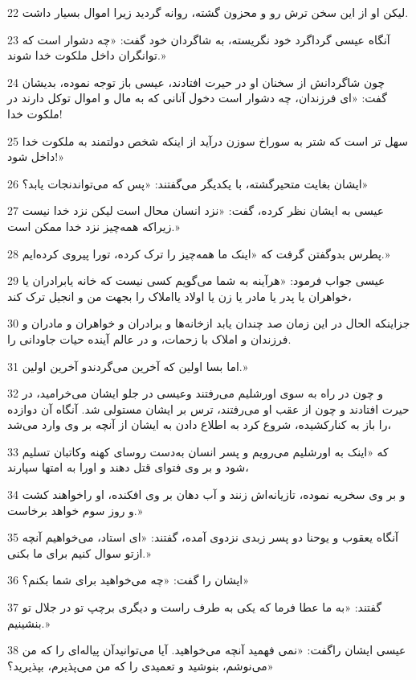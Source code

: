 \par 22 لیکن او از این سخن ترش رو و محزون گشته، روانه گردید زیرا اموال بسیار داشت.
\par 23 آنگاه عیسی گرداگرد خود نگریسته، به شاگردان خود گفت: «چه دشوار است که توانگران داخل ملکوت خدا شوند.»
\par 24 چون شاگردانش از سخنان او در حیرت افتادند، عیسی باز توجه نموده، بدیشان گفت: «ای فرزندان، چه دشوار است دخول آنانی که به مال و اموال توکل دارند در ملکوت خدا!
\par 25 سهل تر است که شتر به سوراخ سوزن درآید از اینکه شخص دولتمند به ملکوت خدا داخل شود!»
\par 26 ایشان بغایت متحیرگشته، با یکدیگر می‌گفتند: «پس که می‌تواندنجات یابد؟»
\par 27 عیسی به ایشان نظر کرده، گفت: «نزد انسان محال است لیکن نزد خدا نیست زیراکه همه‌چیز نزد خدا ممکن است.»
\par 28 پطرس بدوگفتن گرفت که «اینک ما همه‌چیز را ترک کرده، تورا پیروی کرده‌ایم.»
\par 29 عیسی جواب فرمود: «هرآینه به شما می‌گویم کسی نیست که خانه یابرادران یا خواهران یا پدر یا مادر یا زن یا اولاد یااملاک را بجهت من و انجیل ترک کند،
\par 30 جزاینکه الحال در این زمان صد چندان یابد ازخانه‌ها و برادران و خواهران و مادران و فرزندان و املاک با زحمات، و در عالم آینده حیات جاودانی را.
\par 31 اما بسا اولین که آخرین می‌گردندو آخرین اولین.»
\par 32 و چون در راه به سوی اورشلیم می‌رفتند وعیسی در جلو ایشان می‌خرامید، در حیرت افتادند و چون از عقب او می‌رفتند، ترس بر ایشان مستولی شد. آنگاه آن دوازده را باز به کنارکشیده، شروع کرد به اطلاع دادن به ایشان از آنچه بر وی وارد می‌شد،
\par 33 که «اینک به اورشلیم می‌رویم و پسر انسان به‌دست روسای کهنه وکاتبان تسلیم شود و بر وی فتوای قتل دهند و اورا به امتها سپارند،
\par 34 و بر وی سخریه نموده، تازیانه‌اش زنند و آب دهان بر وی افکنده، او راخواهند کشت و روز سوم خواهد برخاست.»
\par 35 آنگاه یعقوب و یوحنا دو پسر زبدی نزدوی آمده، گفتند: «ای استاد، می‌خواهیم آنچه ازتو سوال کنیم برای ما بکنی.»
\par 36 ایشان را گفت: «چه می‌خواهید برای شما بکنم؟»
\par 37 گفتند: «به ما عطا فرما که یکی به طرف راست و دیگری برچپ تو در جلال تو بنشینیم.»
\par 38 عیسی ایشان راگفت: «نمی فهمید آنچه می‌خواهید. آیا می‌توانیدآن پیاله‌ای را که من می‌نوشم، بنوشید و تعمیدی را که من می‌پذیرم، بپذیرید؟»

